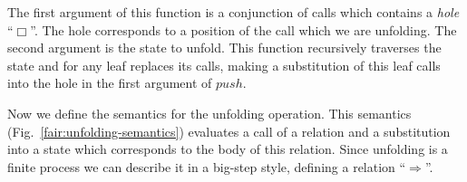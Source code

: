 
The first argument of this function is a conjunction of calls which contains a \emph{hole} ``$\Box$''. The hole corresponds to a position of the call which we are unfolding. 
The second argument is the state to unfold. This function recursively traverses the state and for any leaf replaces its calls, making a substitution of
this leaf calls into the hole in the first argument of $push$.

Now we define the semantics for the unfolding operation. This semantics (Fig.~\ref{fair:unfolding-semantics}) evaluates a call of a relation and a substitution into a state which
corresponds to the body of this relation. Since unfolding is a finite process we can describe it in a big-step style, defining a relation ``$\Rightarrow$''.

